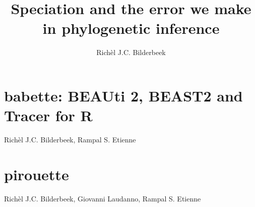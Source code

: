 \documentclass[]{dissertation}
\newcommand\blankpage{%
    \null
    \thispagestyle{empty}%
    \addtocounter{page}{-1}%
    \newpage}
\begin{document}
\title{Speciation and the error we make in phylogenetic inference}
\author{Richèl J.C. Bilderbeek}


\frontmatter



\tableofcontents

\mainmatter

\thumbtrue



\afterpage{\blankpage}






\chapter{babette: BEAUti 2, BEAST2 and Tracer for R}
\label{chapter_babette}
Rich\`el J.C. Bilderbeek, Rampal S. Etienne
\newpage



\chapter{pirouette}
\label{chapter_pirouette}
Rich\`el J.C. Bilderbeek, Giovanni Laudanno, Rampal S. Etienne
\newpage
\end{document}
